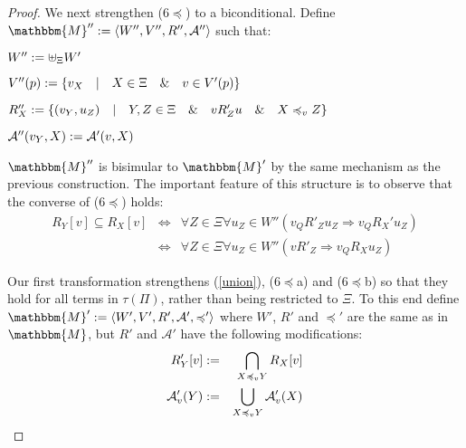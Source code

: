 \begin{proof}
  
  
  We next strengthen (6$\preccurlyeq$) to a biconditional.  Define
  $\mathbbm{M}'' \assign \langle W'', V'', R'', \mathcal{A}'' \rangle$ such
  that:
  \begin{itemizedot}
    \item $W'' := \uplus_{\Xi} W'$
    
    \item $V'' (p) := \{v_X \hspace{1em} | \hspace{1em} X \in \Xi
    \hspace{1em} \& \hspace{1em} v \in V' (p)\}$
    
    \item $R''_X := \{(v_Y, u_Z) \hspace{1em} | \hspace{1em} Y, Z \in \Xi
    \hspace{1em} \& \hspace{1em} v R'_Z u \hspace{1em} \& \hspace{1em} X
    \preccurlyeq_v Z\}$
    
    \item $\mathcal{A}'' (v_Y, X) := \mathcal{A}' (v, X)$
  \end{itemizedot}
  $\mathbbm{M}''$ is bisimular to $\mathbbm{M}'$ by the same mechanism as the
  previous construction.  The important feature of this structure is to
  observe that the converse of (6$\preccurlyeq$) holds:
  \begin{eqnarray*}
    R_Y [v] \subseteq R_X [v] & \Longleftrightarrow & \forall Z \in \Xi
    \forall u_Z \in W'' (v_Q R'_Z u_Z \Longrightarrow v_Q R_X' u_Z)\\
    & \Longleftrightarrow & \forall Z \in \Xi \forall u_Z \in W'' (v R'_Z
    \Longrightarrow v_Q R_X u_Z)
  \end{eqnarray*}
  
  
  Our first transformation strengthens (\ref{union}), (6$\preccurlyeq$a) and
  (6$\preccurlyeq$b) so that they hold for all terms in $\tau (\Pi)$, rather
  than being restricted to $\Xi$.  To this end define $\mathbbm{M}' \assign
  \langle W', V', R', \mathcal{A}', \preccurlyeq' \rangle$ where $W'$, $R'$
  and $\preccurlyeq'$ are the same as in $\mathbbm{M}$, but $R'$ and
  $\mathcal{A}'$ have the following modifications:
  \begin{eqnarray}
    R'_Y [v] & := & \bigcap_{X \preccurlyeq_v Y} R_X [v] \nonumber\\
    \mathcal{A}'_v (Y) & := & \bigcup_{X \preccurlyeq_v Y} \mathcal{A}'_v
    (X) \nonumber
  \end{eqnarray}
  
\end{proof}
